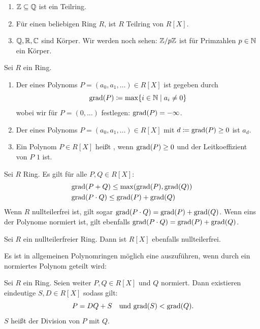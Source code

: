 \begin{beispiel}
  \begin{enumerate}
  \item \(\mathbb{Z}\subseteq \mathbb{Q}\) ist ein Teilring. 
  \item Für einen beliebigen Ring \(R\), ist \(R\) Teilring von \(R[X]\).
  \item \(\mathbb{Q},\mathbb{R},\mathbb{C}\) sind Körper. Wir werden noch sehen: \(\mathbb{Z}/p\mathbb{Z}\) ist für Primzahlen \(p\in\mathbb{N}\) ein Körper.
  \end{enumerate}
\end{beispiel}

\begin{definition}
  Sei \(R\) ein Ring.
  \begin{enumerate}
  \item Der  eines Polynoms \(P=(a_0,a_1,\dots)\in R[X]\) ist gegeben durch
\[
\mathrm{grad}(P)\coloneq \max \{i\in\mathbb{N}\mid a_i\neq 0\}
\]
wobei wir für \(P=(0,\dots)\) festlegen: \(\mathrm{grad}(P)=-\infty\).
\item Der  eines Polynoms \(P=(a_0,a_1,\dots)\in R[X]\) mit \(d\coloneq \mathrm{grad}(P)\geq 0\) ist \(a_d\).  
  \item Ein Polynom \(P\in R[X]\) heißt , wenn \(\mathrm{grad}(P)\geq 0\) und der Leitkoeffizient von \(P\) \(1\) ist.
  \end{enumerate}
\end{definition}

\begin{bemerkung}
  Sei \(R\) Ring.
  Es gilt für alle \(P,Q\in R[X]\):
  \begin{align*}
    & \mathrm{grad}(P+Q)\leq \max(\mathrm{grad}(P),\mathrm{grad}(Q)) \\
    & \mathrm{grad}(P\cdot Q)\leq \mathrm{grad}(P)+\mathrm{grad}(Q)     
  \end{align*}
  Wenn \(R\) nullteilerfrei ist, gilt sogar \(\mathrm{grad}(P\cdot Q)=\mathrm{grad}(P)+\mathrm{grad}(Q)\).
  Wenn eins der Polynome normiert ist, gilt ebenfalls \(\mathrm{grad}(P\cdot Q)=\mathrm{grad}(P)+\mathrm{grad}(Q)\).
\end{bemerkung}

\begin{lemma}
  Sei \(R\) ein nullteilerfreier Ring. Dann ist \(R[X]\) ebenfalls nullteilerfrei.
\end{lemma}

Es ist in allgemeinen Polynomringen möglich eine  auszuführen, wenn durch ein normiertes Polynom geteilt wird:

\begin{bemerkung}
  \label{polynomdivision-mit-rest}
  Sei \(R\) ein Ring.
  Seien weiter \(P,Q\in R[X]\) und \(Q\) normiert.
  Dann existieren eindeutige \(S,D\in R[X]\) sodass gilt:
  \[
    P=DQ+S\text{\quad und }\grad(S)<\grad(Q)\rlap{.}
  \]
  \(S\) heißt  der Division von \(P\) mit \(Q\).
\end{bemerkung}

